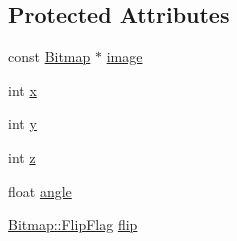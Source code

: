 \subsection*{Protected Attributes}
\begin{DoxyCompactItemize}
\item 
const \hyperlink{classZeta_1_1Bitmap}{Bitmap} $\ast$ \hyperlink{classZeta_1_1Cell_1_1Sprite_af36bb2f8a2d321718e8f78585a732c3c}{image}
\item 
int \hyperlink{classZeta_1_1Cell_1_1Sprite_aed4855117315ce32960e1c4282e580e2}{x}
\item 
int \hyperlink{classZeta_1_1Cell_1_1Sprite_afccf05d1dfa7d34ee26386c2435d1013}{y}
\item 
int \hyperlink{classZeta_1_1Cell_1_1Sprite_adef754042fa2f27edabeffe9342a66b5}{z}
\item 
float \hyperlink{classZeta_1_1Cell_1_1Sprite_a4313514d9f73710ec8d4bbc2cfa7695f}{angle}
\item 
\hyperlink{classZeta_1_1Bitmap_a8cb28cf4226b7d6bedf6c9bb2413b3fa}{Bitmap\+::\+Flip\+Flag} \hyperlink{classZeta_1_1Cell_1_1Sprite_aa361f0dca933bdf723194d0c5b667220}{flip}
\end{DoxyCompactItemize}



